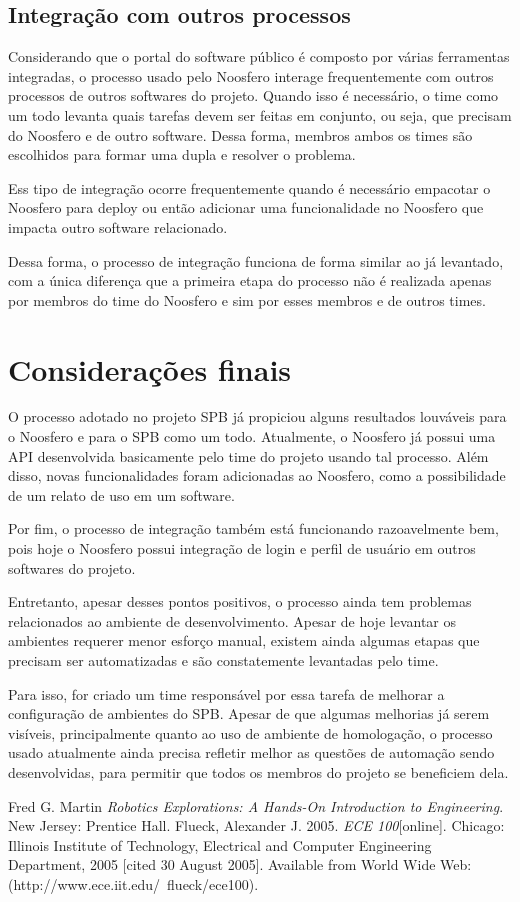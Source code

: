\documentclass[a4paper, 11pt]{article}
\begin{document}
\subsection*{Integração com outros processos}

Considerando que o portal do software público é composto por várias ferramentas
integradas, o processo usado pelo Noosfero interage frequentemente com outros
processos de outros softwares do projeto. Quando isso é necessário, o time como
um todo levanta quais tarefas devem ser feitas em conjunto, ou seja, que
precisam do Noosfero e de outro software. Dessa forma, membros ambos os times
são escolhidos para formar uma dupla e resolver o problema.

Ess tipo de integração ocorre frequentemente quando é necessário empacotar o
Noosfero para deploy ou então adicionar uma funcionalidade no Noosfero que
impacta outro software relacionado.

Dessa forma, o processo de integração funciona de forma similar ao já levantado,
com a única diferença que a primeira etapa do processo não é realizada apenas
por membros do time do Noosfero e sim por esses membros e de outros times.

\section*{Considerações finais}

O processo adotado no projeto SPB já propiciou alguns resultados louváveis para
o Noosfero e para o SPB como um todo. Atualmente, o Noosfero já possui uma API
desenvolvida basicamente pelo time do projeto usando tal processo. Além disso,
novas funcionalidades foram adicionadas ao Noosfero, como a possibilidade de um
relato de uso em um software.

Por fim, o processo de integração também está funcionando razoavelmente bem,
pois hoje o Noosfero possui integração de login e perfil de usuário em outros
softwares do projeto.

Entretanto, apesar desses pontos positivos, o processo ainda tem problemas
relacionados ao ambiente de desenvolvimento. Apesar de hoje levantar os
ambientes requerer menor esforço manual, existem ainda algumas etapas que
precisam ser automatizadas e são constatemente levantadas pelo time.

Para isso, for criado um time responsável por essa tarefa de melhorar a
configuração de ambientes do SPB. Apesar de que algumas melhorias já serem
visíveis, principalmente quanto ao uso de ambiente de homologação, o processo
usado atualmente ainda precisa refletir melhor as questões de automação sendo
desenvolvidas, para permitir que todos os membros do projeto se beneficiem dela.

\begin{thebibliography}{9}
 Fred G. Martin \emph{Robotics Explorations: A Hands-On
Introduction to Engineering}. New Jersey: Prentice Hall.
  Flueck, Alexander J. 2005. \emph{ECE 100}[online]. Chicago:
Illinois Institute of Technology, Electrical and Computer Engineering
Department, 2005 [cited 30
August 2005]. Available from World Wide Web:
(http://www.ece.iit.edu/~flueck/ece100).
\end{thebibliography}
\end{document}
